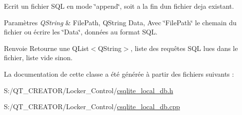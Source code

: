 Ecrit un fichier S\+Q\+L en mode \char`\"{}append\char`\"{}, soit a la fin d\textquotesingle{}un fichier deja existant. 


\begin{DoxyParams}{Paramètres}
{\em Q\+String} & File\+Path, Q\+String Data, Avec \char`\"{}\+File\+Path\char`\"{} le chemain du fichier ou écrire les \char`\"{}\+Data\char`\"{}, données au format S\+Q\+L.\\
\hline
\end{DoxyParams}
\begin{DoxyReturn}{Renvoie}
Retourne une Q\+List$<$\+Q\+String$>$, liste des requêtes S\+Q\+L lues dans le fichier, liste vide sinon. 
\end{DoxyReturn}


La documentation de cette classe a été générée à partir des fichiers suivants \+:\begin{DoxyCompactItemize}
\item 
S\+:/\+Q\+T\+\_\+\+C\+R\+E\+A\+T\+O\+R/\+Locker\+\_\+\+Control/\hyperlink{csqlite__local__db_8h}{csqlite\+\_\+local\+\_\+db.\+h}\item 
S\+:/\+Q\+T\+\_\+\+C\+R\+E\+A\+T\+O\+R/\+Locker\+\_\+\+Control/\hyperlink{csqlite__local__db_8cpp}{csqlite\+\_\+local\+\_\+db.\+cpp}\end{DoxyCompactItemize}
